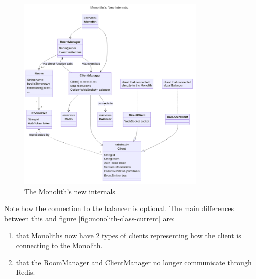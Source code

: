 \begin{figure}[!h]
  \centering
  \includegraphics[width=0.8\textwidth]{Figures/monolith-class-new.png}
  \caption{The Monolith's new internals}
  \label{fig:monolith-class-new}
\end{figure}

Note how the connection to the balancer is optional. The main differences between this and figure \ref{fig:monolith-class-current} are:
\begin{enumerate}
  \item that Monoliths now have 2 types of clients representing how the client is connecting to the Monolith.
  \item that the RoomManager and ClientManager no longer communicate through Redis.
\end{enumerate}